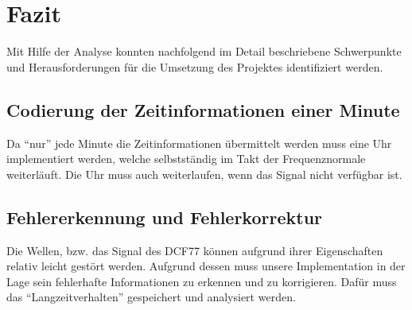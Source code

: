 \section{Fazit}
Mit Hilfe der Analyse konnten nachfolgend im Detail beschriebene Schwerpunkte und Herausforderungen für die Umsetzung des Projektes identifiziert werden.

\subsection{Codierung der Zeitinformationen einer Minute}
Da "`nur"' jede Minute die Zeitinformationen übermittelt werden muss eine Uhr implementiert werden, welche selbstständig im Takt der Frequenznormale weiterläuft. Die Uhr muss auch weiterlaufen, wenn das Signal nicht verfügbar ist.

\subsection{Fehlererkennung und Fehlerkorrektur}
Die Wellen, bzw. das Signal des DCF77 können aufgrund ihrer Eigenschaften relativ leicht gestört werden. Aufgrund dessen muss unsere Implementation in der Lage sein fehlerhafte Informationen zu erkennen und zu korrigieren. Dafür muss das "`Langzeitverhalten"' gespeichert und analysiert werden.


